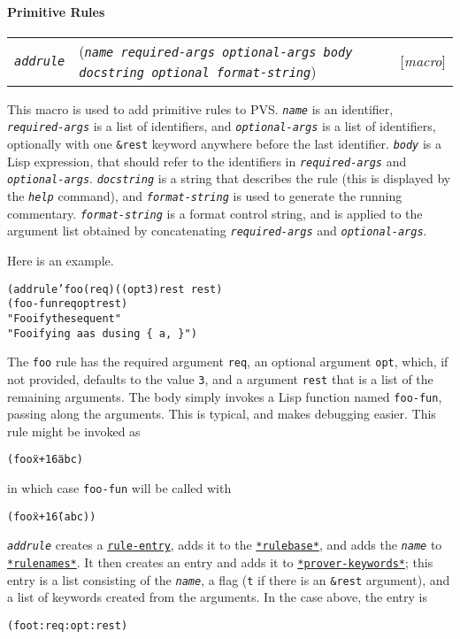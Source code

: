 \documentclass[12pt]{book}
\makeatletter
\def\ampoptional{{\smaller\sc {\smaller\smaller \&}optional\ }}
\def\amprest{{\smaller\sc {\smaller\smaller \&}rest\ }}
\newenvironment{function}[3]%
{\par\noindent\begin{boxedminipage}{\textwidth}%
 \par\noindent\begin{tabularx}{\linewidth}{l>{\raggedright}Xr}%
 \functionhtgt{#1}&(\texttt{\textit{#2}})&[\emph{#3}]%
 \end{tabularx}\par\flushright\begin{minipage}{.97\textwidth}}
{\end{minipage}\end{boxedminipage}}
\newcommand{\functionarg}[1]{\texttt{\textit{#1}}}
\newcommand{\functionnm}[1]{\texttt{\textit{#1}}}
\newcommand{\functionhtgt}[1]{\hypertarget{#1}{\functionnm{#1}}\index{#1@\functionnm{#1}|underline}}
\newenvironment{macro}[2]%
{\begin{function}{#1}{#2}{macro}}{\end{function}}
\newcommand{\classnm}[1]{\texttt{\textup{#1}}}
\newcommand{\classhln}[1]{\hyperlink{#1}{\classnm{#1}}}
\newcommand{\globalnm}[1]{\texttt{\textup{#1}}}
\newcommand{\globalhln}[1]{\hyperlink{#1}{\globalnm{#1}}}
\makeatother
\begin{document}
\paragraph{Primitive Rules}

\begin{macro}{addrule}
  {name required-args optional-args body docstring \ampoptional format-string}
This macro is used to add primitive rules to PVS. \functionarg{name} is an
identifier, \functionarg{required-args} is a list of identifiers, and
\functionarg{optional-args} is a list of identifiers, optionally with one
\texttt{\&rest} keyword anywhere before the last identifier.
\functionarg{body} is a Lisp expression, that should refer to the identifiers
in \functionarg{required-args} and \functionarg{optional-args}.
\functionarg{docstring} is a string that describes the rule (this is
displayed by the \functionnm{help} command), and
\functionarg{format-string} is used to generate the running commentary.
\functionarg{format-string} is a format control string, and is applied to
the argument list obtained by concatenating \functionarg{required-args}
and \functionarg{optional-args}.

Here is an example.
\begin{alltt}
(addrule 'foo (req) ((opt 3) \amprest rest)
  (foo-fun req opt rest)
  "Fooify the sequent"
  "Fooifying ~a as ~d using ~\{~a, ~\}")
\end{alltt}
The \texttt{foo} rule has the required argument \texttt{req}, an optional
argument \texttt{opt}, which, if not provided, defaults to the value
\texttt{3}, and a argument \texttt{rest} that is a list of the remaining
arguments.  The body simply invokes a Lisp function named
\texttt{foo-fun}, passing along the arguments.  This is typical, and makes
debugging easier.  This rule might be invoked as
\begin{alltt}
 (foo \"x + 1\" 6 a b c)
\end{alltt}
in which case \texttt{foo-fun} will be called with
\begin{alltt}
 (foo \"x + 1\" 6 (a b c))
\end{alltt}



\functionarg{addrule} creates a \classhln{rule-entry}, adds it to the
\globalhln{*rulebase*}, and adds the \functionarg{name} to
\globalhln{*rulenames*}.  It then creates an entry and adds it to
\globalhln{*prover-keywords*}; this entry is a list consisting of the
\functionarg{name}, a flag (\texttt{t} if there is an \texttt{\&rest}
argument), and a list of keywords created from the arguments.  In the case
above, the entry is
\begin{alltt}
  (foo t :req :opt :rest)
\end{alltt}

\end{macro}
\end{document}
